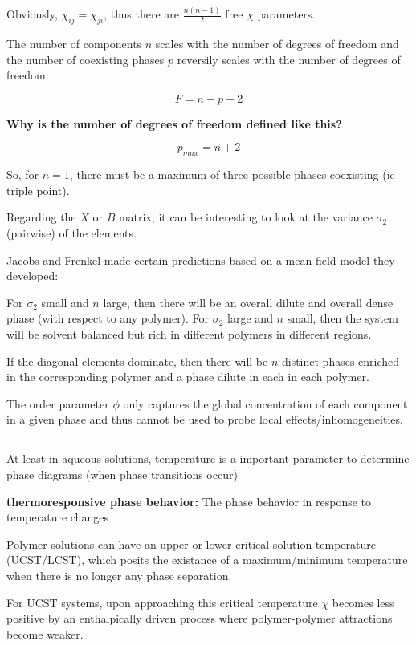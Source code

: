 \documentclass{article}
\begin{document}
Obviously, $\chi_{ij}=\chi_{ji}$, thus there are $\frac{n(n-1)}{2}$ free $\chi$ parameters.

The number of components $n$ scales with the number of degrees of freedom and the number of coexisting phases $p$ reversily scales with the number of degrees of freedom:

\[F=n-p+2\]

\textbf{Why is the number of degrees of freedom defined like this?}

\[p_{max}=n+2\]

So, for $n=1$, there must be a maximum of three possible phases coexisting (ie triple point).

Regarding the $X$ or $B$ matrix, it can be interesting to look at the variance $\sigma_{2}$ (pairwise) of the elements.

Jacobs and Frenkel made certain predictions based on a mean-field model they developed:

For $\sigma_{2}$ small and $n$ large, then there will be an overall dilute and overall dense phase (with respect to any polymer). For $\sigma_2$ large and $n$ small, then the system will be solvent balanced but rich in different polymers in different regions.

If the diagonal elements dominate, then there will be $n$ distinct phases enriched in the corresponding polymer and a phase dilute in each in each polymer.

The order parameter $\phi$ only captures the global concentration of each component in a given phase and thus cannot be used to probe local effects/inhomogeneities.

\subsection{}

At least in aqueous solutions, temperature is a important parameter to determine phase diagrams (when phase transitions occur)

\textbf{thermoresponsive phase behavior: }The phase behavior in response to temperature changes

Polymer solutions can have an upper or lower critical solution temperature (UCST/LCST), which posits the existance of a maximum/minimum temperature when there is no longer any phase separation.

For UCST systems, upon approaching this critical temperature $\chi$ becomes less positive by an enthalpically driven process where polymer-polymer attractions become weaker.
\end{document}
